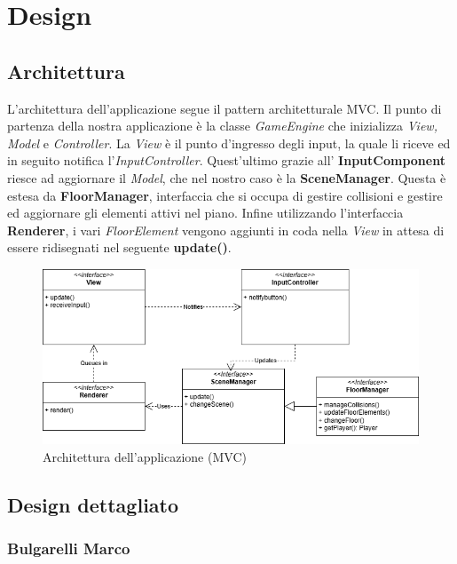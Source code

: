 \documentclass{report}
\begin{document}
\chapter{Design}

\section{Architettura}

L'architettura dell'applicazione segue il pattern architetturale MVC. Il punto di partenza della nostra applicazione è la classe \textit{GameEngine} che inizializza \textit{View, Model} e \textit{Controller}. 
%
La \textit{View} è il punto d'ingresso degli input, la quale li riceve ed in seguito notifica l'\textit{InputController}. Quest'ultimo grazie all' \textbf{InputComponent} riesce ad aggiornare 
%
il \textit{Model}, che nel nostro caso è la \textbf{SceneManager}. Questa è estesa da \textbf{FloorManager}, interfaccia che si occupa di gestire collisioni e gestire ed aggiornare
%
gli elementi attivi nel piano. Infine utilizzando l'interfaccia \textbf{Renderer}, i vari \textit{FloorElement} vengono aggiunti in coda nella \textit{View} in attesa di essere
%
ridisegnati nel seguente \textbf{update()}.
%

\begin{figure}[H]
    \centering{}
    \includegraphics[width=13cm]{MVCProgetto.png}
    \caption{Architettura dell'applicazione (MVC)}
    \label{img:analysis}
\end{figure}

\section{Design dettagliato}

\subsection{Bulgarelli Marco}
\end{document}
